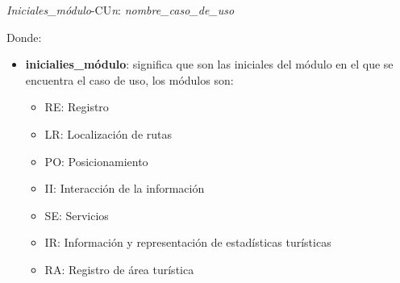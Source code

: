 \begin{center}
	\Huge{\textit{Iniciales\_módulo}-CU\textit{n}: \textit{nombre\_caso\_de\_uso}}
\end{center}

Donde: 

\begin{itemize}
	\item \textbf{inicialies\_módulo}: significa que son las iniciales del módulo en el que se encuentra el caso de uso, los módulos son: 
	\begin{itemize}
		\item RE: Registro
		\item LR: Localización de rutas
		\item PO: Posicionamiento
		\item II: Interacción de la información
		\item SE: Servicios
		\item IR: Información y representación de estadísticas turísticas
		\item RA: Registro de área turística
	\end{itemize}
\end{itemize}

